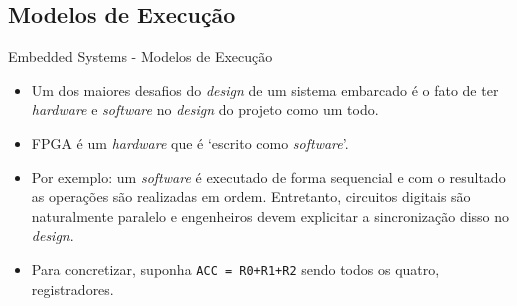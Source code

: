 \documentclass[aspectratio=169]{beamer}
\begin{document}

	
	\subsection{Modelos de Execução}
	\begin{frame}{Embedded Systems - Modelos de Execução}
		\begin{itemize}
			\setlength\itemsep{1em}
			\item Um dos maiores desafios do \textit{design} de um sistema embarcado é o fato de ter \textit{hardware} e \textit{software} no \textit{design} do projeto como um todo.
			
			\item FPGA é um \textit{hardware} que é `escrito como \textit{software}'.
			
			\item Por exemplo: um \textit{software} é executado de forma sequencial e com o resultado as operações são realizadas em ordem. Entretanto, circuitos digitais são naturalmente paralelo e engenheiros devem explicitar a sincronização disso no \textit{design}.
			
			\item Para concretizar, suponha \texttt{ACC = R0+R1+R2} sendo todos os quatro, registradores.
		\end{itemize}
	\end{frame}
\end{document}
